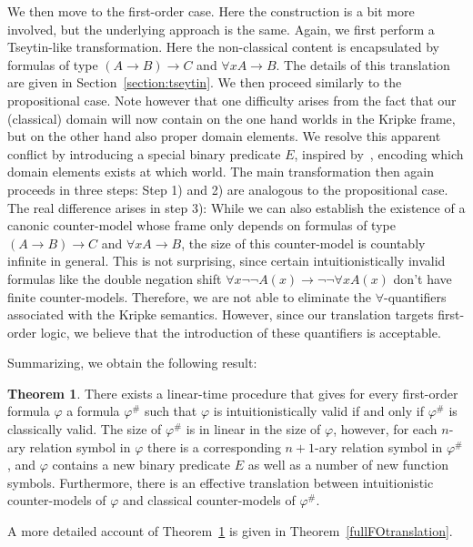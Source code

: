 \documentclass[a4paper,11pt]{report}
\theoremstyle{definition}
\newtheorem{theorem}{Theorem}[section]
\theoremstyle{definition}
\theoremstyle{definition}
\theoremstyle{definition}
\theoremstyle{definition}
\theoremstyle{definition}
\theoremstyle{definition}
\begin{document}
	We then move to the first-order case. Here the construction is a bit more involved, but the underlying approach is the same.
	Again, we first perform a Tseytin-like transformation.
	Here the non-classical content is encapsulated by formulas of type $(A\to B)\to C$ and $\forall xA\to B$.
	The details of this translation are given in Section~\ref{section:tseytin}.
	We then proceed similarly to the propositional case.
	Note however that one difficulty arises from the fact that our (classical) domain will now contain on the one hand worlds in the Kripke frame, but on the other hand also proper domain elements.
	We resolve this apparent conflict by introducing a special binary predicate $E$, inspired by~\cite{iemhoff2010eskolemization}, encoding which domain elements exists at which world.
	The main transformation then again proceeds in three steps:
	Step 1) and 2) are analogous to the propositional case.
	The real difference arises in step 3):
	While we can also establish the existence of a canonic counter-model whose frame only depends on formulas of type $(A\to B)\to C$ and $\forall xA\to B$, the size of this counter-model is countably infinite in general.
	This is not surprising, since certain intuitionistically invalid formulas like the double negation shift $\forall x\neg\neg A(x)\to \neg\neg\forall x A(x)$ don't have finite counter-models.
	Therefore, we are not able to eliminate the $\forall$-quantifiers associated with the Kripke semantics.
	However, since our translation targets first-order logic, we believe that the introduction of these quantifiers is acceptable.
	
	Summarizing, we obtain the following result:
	
	\begin{theorem}
		\label{thm:reduction-first-order-short}
		There exists a linear-time procedure that gives for every first-order formula $\varphi$ a formula $\varphi^\#$ such that $\varphi$ is intuitionistically valid if and only if $\varphi^\#$ is classically valid. The size of $\varphi^\#$ is in linear in the size of $\varphi$, however, for each $n$-ary relation symbol in $\varphi$ there is a corresponding $n+1$-ary relation symbol in $\varphi^\#$, and $\varphi$ contains a new binary predicate $E$ as well as a number of new function symbols. Furthermore, there is an effective translation between intuitionistic counter-models of $\varphi$ and classical counter-models of $\varphi^\#$.
	\end{theorem}
	A more detailed account of Theorem~\ref{thm:reduction-first-order-short} is given in Theorem~\ref{fullFOtranslation}.
	
\end{document}
